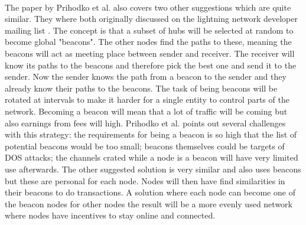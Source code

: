 \documentclass[informationsecurity]{gucmasterproject}
\begin{document}
\paragraph{}
The  paper by Prihodko et al.\cite{prihodko2016flare} also covers two other suggestions which are quite similar.
They where both originally discussed on the lightning network developer mailing list\cite{rusty_routing1} \cite{rusty_routing2} \cite{rusty_routing3}. The concept is that a subset of hubs will be selected at random to become global "beacons". The other nodes find the paths to these, meaning the beacons will act as meeting place between sender and receiver. The receiver will know its paths to the beacons and therefore pick the best one and send it to the sender. Now the sender knows the path from a beacon to the sender and they already know their paths to the beacons. The task of being beacons will be rotated at intervals to make it harder for a single entity to control parts of the network. Becoming a beacon will mean that a lot of traffic will be coming but also earnings from fees will high.
Prihodko et al.\cite{prihodko2016flare} points out several challenges with this strategy: the requirements for being a beacon is so high that the list of potential beacons would be too small; beacons themselves could be targets of DOS attacks; the channels crated while a node is a beacon will have very limited use afterwards. The other suggested solution is very similar and also uses beacons but these are personal for each node. Nodes will then have find similarities in their beacons to do transactions. A solution where each node can become one of the beacon nodes for other nodes the result will be a more evenly used network where nodes have incentives to stay online and connected.
\end{document}
